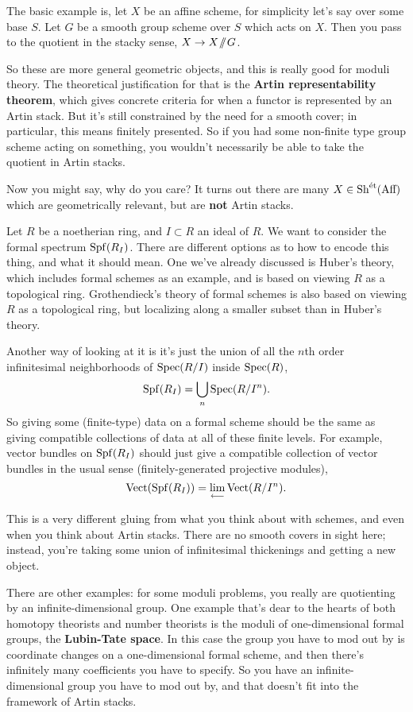 The basic example is, let $X$ be an affine scheme, for simplicity let's say over some base $S$. Let $G$ be a smooth group scheme over $S$ which acts on $X$. Then you pass to the quotient in the stacky sense, $X \to X\mathbin{\!/\!\!/\!} G$.

So these are more general geometric objects, and this is really good for moduli theory. The theoretical justification for that is the \textbf{Artin representability theorem}, which gives concrete criteria for when a functor is represented by an Artin stack. But it's still constrained by the need for a smooth cover; in particular, this means finitely presented. So if you had some non-finite type group scheme acting on something, you wouldn't necessarily be able to take the quotient in Artin stacks.

Now you might say, why do you care? It turns out there are many $X\in\operatorname{Sh}^{\text{\'et}}(\text{Aff})$ which are geometrically relevant, but are \textbf{not} Artin stacks.

\begin{example}
  \label{ex:15-formal-schemes}
  Let $R$ be a noetherian ring, and $I\subset R$ an ideal of $R$. We want to consider the formal spectrum $\operatorname{Spf}(R_I)$. There are different options as to how to encode this thing, and what it should mean. One we've already discussed is Huber's theory, which includes formal schemes as an example, and is based on viewing $R$ as a topological ring. Grothendieck's theory of formal schemes is also based on viewing $R$ as a topological ring, but localizing along a smaller subset than in Huber's theory.
  
  Another way of looking at it is it's just the union of all the $n$th order infinitesimal neighborhoods of $\operatorname{Spec}(R/I)$ inside $\operatorname{Spec}(R)$,
  \[ \operatorname{Spf}(R_I) = \bigcup_n \operatorname{Spec}(R/I^n). \]
  So giving some (finite-type) data on a formal scheme should be the same as giving compatible collections of data at all of these finite levels. For example, vector bundles on $\operatorname{Spf}(R_I)$ should just give a compatible collection of vector bundles in the usual sense (finitely-generated projective modules),
  \[ \text{Vect}(\operatorname{Spf}(R_I)) = \mathop{\operatorname*{lim}\limits_{\longleftarrow}}\limits \text{Vect}(R/I^n). \]
\end{example}

This is a very different gluing from what you think about with schemes, and even when you think about Artin stacks. There are no smooth covers in sight here; instead, you're taking some union of infinitesimal thickenings and getting a new object.

There are other examples: for some moduli problems, you really are quotienting by an infinite-dimensional group. One example that's dear to the hearts of both homotopy theorists and number theorists is the moduli of one-dimensional formal groups, the \textbf{Lubin-Tate space}. In this case the group you have to mod out by is coordinate changes on a one-dimensional formal scheme, and then there's infinitely many coefficients you have to specify. So you have an infinite-dimensional group you have to mod out by, and that doesn't fit into the framework of Artin stacks. 

